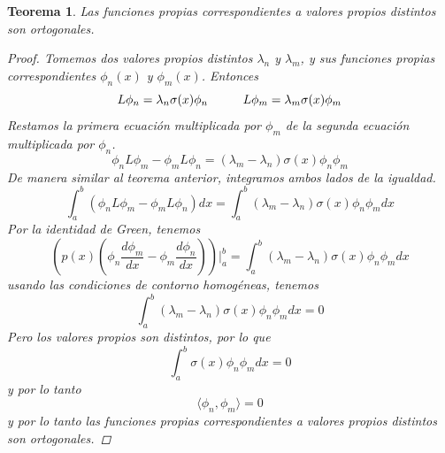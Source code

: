 \documentclass[11pt]{book}
\theoremstyle{plain}
\newtheorem{teo}[proposición]{Teorema}
\theoremstyle{definition}
\begin{document}
    \begin{teo}
        Las funciones propias correspondientes a valores propios distintos son ortogonales.
        \begin{proof}
            Tomemos dos valores propios distintos $\lambda_{n}$ y $\lambda_{m}$, y sus funciones propias correspondientes $\phi_{n}(x)$ y $\phi_{m}(x)$. Entonces
            \[
                L\phi_{n} = \lambda_{n}\sigma(x)\phi_{n} \hspace{10mm} L\phi_{m} = \lambda_{m}\sigma(x)\phi_{m}
            \]
            Restamos la primera ecuación multiplicada por $\phi_{m}$ de la segunda ecuación multiplicada por $\phi_{n}$.
            \[
                \phi_{n}L\phi_{m} - \phi_{m}L\phi_{n} = (\lambda_{m} - \lambda_{n})\sigma(x)\phi_{n}\phi_{m}
            \]
            De manera similar al teorema anterior, integramos ambos lados de la igualdad.
            \[
                \int_{a}^{b} \left(\phi_{n}L\phi_{m} - \phi_{m}L\phi_{n}\right)dx = \int_{a}^{b} (\lambda_{m} - \lambda_{n})\sigma(x)\phi_{n}\phi_{m}dx
            \]
            Por la identidad de Green, tenemos
            \[
                \left(p(x)\left(\phi_{n}\frac{d\phi_{m}}{dx} - \phi_{m}\frac{d\phi_{n}}{dx}\right)\right)|_{a}^{b} = \int_{a}^{b} (\lambda_{m} - \lambda_{n})\sigma(x)\phi_{n}\phi_{m}dx
            \]
            usando las condiciones de contorno homogéneas, tenemos
            \[
                \int_{a}^{b} (\lambda_{m} - \lambda_{n})\sigma(x)\phi_{n}\phi_{m}dx = 0
            \]
            Pero los valores propios son distintos, por lo que
            \[
                \int_{a}^{b} \sigma(x)\phi_{n}\phi_{m}dx = 0
            \]
            y por lo tanto
            \[
                \langle \phi_{n}, \phi_{m} \rangle = 0
            \]
            y por lo tanto las funciones propias correspondientes a valores propios distintos son ortogonales.
        \end{proof}
    \end{teo}
\end{document}
